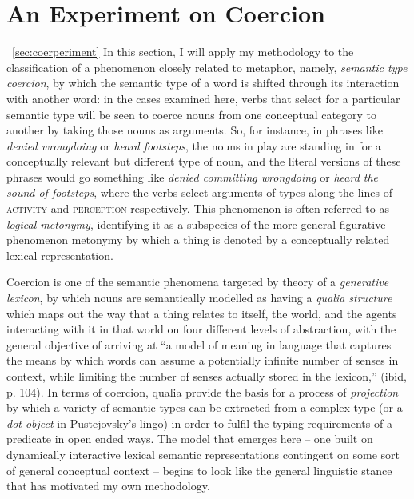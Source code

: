 \section{An Experiment on Coercion} ~\ref{sec:coerperiment}
In this section, I will apply my methodology to the classification of a phenomenon closely related to metaphor, namely, \emph{semantic type coercion}, by which the semantic type of a word is shifted through its interaction with another word: in the cases examined here, verbs that select for a particular semantic type will be seen to coerce nouns from one conceptual category to another by taking those nouns as arguments.  So, for instance, in phrases like \emph{denied wrongdoing} or \emph{heard footsteps}, the nouns in play are standing in for a conceptually relevant but different type of noun, and the literal versions of these phrases would go something like \emph{denied committing wrongdoing} or \emph{heard the sound of footsteps}, where the verbs select arguments of types along the lines of \textsc{activity} and \textsc{perception} respectively.  This phenomenon is often referred to as \emph{logical metonymy}, identifying it as a subspecies of the more general figurative phenomenon metonymy by which a thing is denoted by a conceptually related lexical representation.

Coercion is one of the semantic phenomena targeted by  theory of a \emph{generative lexicon}, by which nouns are semantically modelled as having a \emph{qualia structure} which maps out the way that a thing relates to itself, the world, and the agents interacting with it in that world on four different levels of abstraction, with the general objective of arriving at ``a model of meaning in language that captures the means by which words can assume a potentially infinite number of senses in context, while limiting the number of senses actually stored in the lexicon,'' (ibid, p. 104).  In terms of coercion, qualia provide the basis for a process of \emph{projection} by which a variety of semantic types can be extracted from a complex type (or a \emph{dot object} in Pustejovsky's lingo) in order to fulfil the typing requirements of a predicate in open ended ways.  The model that emerges here -- one built on dynamically interactive lexical semantic representations contingent on some sort of general conceptual context -- begins to look like the general linguistic stance that has motivated my own methodology.

